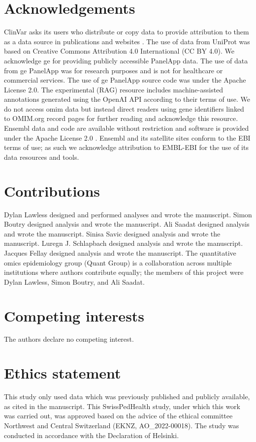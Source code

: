 \section*{Acknowledgements}
\noindent
ClinVar asks its users who distribute or copy data to provide attribution to them as a data source in publications and websites \cite{landrum_clinvar_2018}.
The use of data from UniProt was based on Creative Commons Attribution 4.0 International (CC BY 4.0).
We acknowledge \ac{ge} for providing publicly accessible PanelApp data.
The use of data from \ac{ge} PanelApp was for research purposes and is not for healthcare or commercial services.
The use of  \ac{ge} PanelApp source code was under the Apache License 2.0.
The experimental (RAG) resource includes machine-assisted annotations generated using the OpenAI API according to their terms of use.
We do not access \ac{omim} data but instead direct readers using gene identifiers linked to OMIM.org record pages for further reading and acknowledge this resource.
Ensembl data and code are available without restriction and software is provided under the Apache License 2.0 \cite{dyer_ensembl_2025}. Ensembl and its satellite sites conform to the EBI terms of use; as such we acknowledge attribution to EMBL-EBI for the use of its data resources and tools.

\section*{Contributions}
\noindent 
Dylan Lawless designed and performed analyses and wrote the manuscript.
Simon Boutry designed analysis and wrote the manuscript.
Ali Saadat designed analysis and wrote the manuscript.
Sinisa Savic designed analysis and wrote the manuscript.
Luregn J. Schlapbach designed analysis and wrote the manuscript.
Jacques Fellay designed analysis and wrote the manuscript.
The quantitative omics epidemiology group (Quant Group) is a collaboration across multiple institutions where authors contribute equally; the members of this project were Dylan Lawless, Simon Boutry, and Ali Saadat.

\section*{Competing interests}
\noindent
The authors declare no competing interest. 

\section*{Ethics statement}
\noindent
This study only used data which was previously published and publicly available, as cited in the manuscript.
This  SwissPedHealth study, under which this work was carried out, was approved based on the advice of the ethical committee Northwest and Central Switzerland (EKNZ, AO\_2022-00018). 
The study was conducted in accordance with the Declaration of Helsinki.

